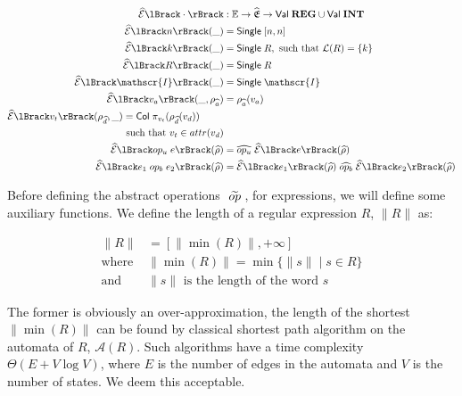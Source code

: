 \begin{align}
    \absexpsem{\cdot} &: \mathbb{E} \rightarrow \ab{\mathfrak{E}} \rightarrow \mathsf{Val} \; \mathbf{REG} \cup \mathsf{Val} \; \mathbf{INT}\\
    \absexpsem{n}(\_) &= \mathsf{Single} \; [n, n] \label{sem:exp1} \\
    \absexpsem{k}(\_) &= \mathsf{Single} \; R,  \text{ such that }\mathcal{L}(R) = \{ k \} \label{sem:exp2} \\
    \absexpsem{R}(\_) &= \mathsf{Single} \; R \label{eq:exp1}\\
    \absexpsem{\mathscr{I}}(\_) &= \mathsf{Single} \; \mathscr{I}\label{eq:exp2} \\
    \absexpsem{v_a}(\_, \rho_{\ab{a}}) &=  \rho_{\ab{a}}(v_a) \label{sem:exp3} \\
    \begin{split}
        \absexpsem{v_t}(\rho_{\ab{d}}, \_) &=  \mathsf{Col} \; \pi_{v_t}(\rho_{\ab{d}}(v_d)) \\
        &\text{ such that } v_t \in attr(v_d) \label{sem:exp4}
    \end{split} \\
    \absexpsem{op_u \; e}(\ab{\environment}) &= \ab{op_u} \; \absexpsem{e}(\ab{\environment}) \label{eq:unary-op} \\
    \absexpsem{e_1 \;op_b\; e_2}(\ab{\environment}) &= \absexpsem{e_1}(\ab{\environment}) \;\ab{op_b}\; \absexpsem{e_2}(\ab{\environment}) \label{eq:binary-op}
\end{align}

Before defining the abstract operations $\;\widetilde{op}\;$, for expressions, we will define some auxiliary functions.
We define the length of a regular expression $R$, $\|R\|$ as:

\begin{align}\label{eq:r1}
    \|R\| & = [\|\min(R)\|, +\infty ] \\
    \text{where } & \|\min(R)\| = \min\{ \|s\| \mid s \in R \} \\ \label{eq:r2}
    \text{and } & \|s\| \text{ is the length of the word $s$}
\end{align}

The former is obviously an over-approximation, the length of the shortest $\|\min(R)\|$ can be found by classical shortest path algorithm on the automata of $R$, $\mathcal{A}(R)$.
Such algorithms have a time complexity $\Theta(E + V \log V)$, where $E$ is the number of edges in the automata and $V$ is the number of states.
We deem this acceptable.

